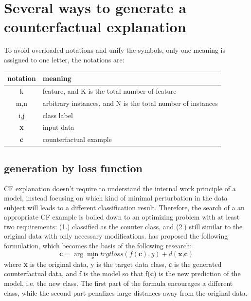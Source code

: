 \section{Several ways to generate a counterfactual explanation}\label{sec:generation}
To avoid overloaded notations and unify the symbols, only one meaning is assigned to one letter, the notations are:

{\centering
\begin{tabular}{|c|l|}
\hline
   notation&meaning\\
  \hline
  k & feature, and K is the total number of feature \\
  m,n & arbitrary instances, and N is the total number of instances \\
  i,j & class label\\
  \hline
  \textbf{x} & input data\\
  \textbf{c} & counterfactual example\\
  \hline
\end{tabular}}
\subsection{generation by loss function}\label{sec:lossFunc}
CF explanation doesn't require to understand the internal work principle of a model, instead focusing on which kind of minimal perturbation in the data subject will leads to a different classification result. Therefore, the search of a an appropriate CF example is boiled down to an optimizing problem with at least two requirements: (1.) classified as the counter class, and (2.) still similar to the original data with only necessary modifications. \cite{watcher2017} has proposed the following formulation, which becomes the basis of the following research:
\begin{equation}\label{eq:watcher}
  \textbf{c}=\arg\min_{\textbf{c}}trgtloss(f(\textbf{c}),y)+d(\textbf{x,c})
\end{equation}
where \textbf{x} is the original data, y is the target data class, \textbf{c} is the generated counterfactual data, and f is the model so that f(\textbf{c}) is the new prediction of the model, i.e. the new class. The first part of the formula encourages a different class, while the second part penalizes large distances away from the original data.

